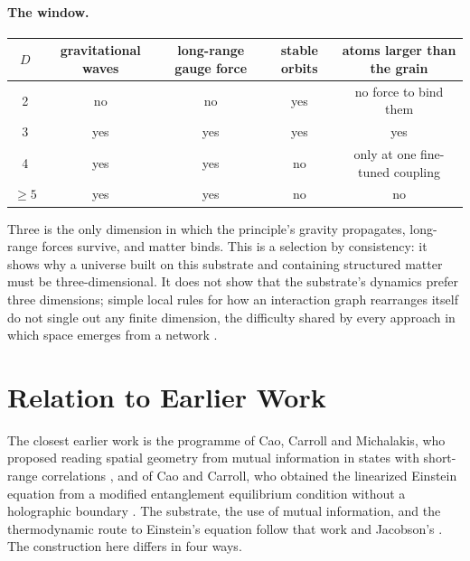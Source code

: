 \documentclass[aps,prd,onecolumn,nofootinbib,superscriptaddress]{revtex4-2}
\begin{document}
\paragraph{The window.}
\begin{center}
\begin{tabular}{|c|c|c|c|c|}
\hline
$D$ & gravitational waves & long-range gauge force & stable orbits & atoms larger than the grain \\
\hline
2 & no & no & yes & no force to bind them \\
3 & yes & yes & yes & yes \\
4 & yes & yes & no & only at one fine-tuned coupling \\
$\ge 5$ & yes & yes & no & no \\
\hline
\end{tabular}
\end{center}
Three is the only dimension in which the principle's gravity propagates, long-range forces survive, and matter binds. This is a selection by consistency: it shows why a universe built on this substrate and containing structured matter must be three-dimensional. It does not show that the substrate's dynamics prefer three dimensions; simple local rules for how an interaction graph rearranges itself do not single out any finite dimension, the difficulty shared by every approach in which space emerges from a network \cite{konopka2008}.

\section{Relation to Earlier Work}
\label{sec:earlier}

The closest earlier work is the programme of Cao, Carroll and Michalakis, who proposed reading spatial geometry from mutual information in states with short-range correlations \cite{cao2017}, and of Cao and Carroll, who obtained the linearized Einstein equation from a modified entanglement equilibrium condition without a holographic boundary \cite{cao2018}. The substrate, the use of mutual information, and the thermodynamic route to Einstein's equation follow that work and Jacobson's \cite{jacobson1995}. The construction here differs in four ways.
\end{document}
